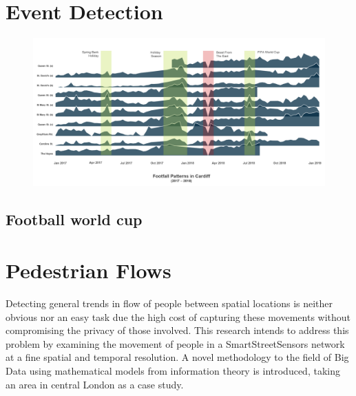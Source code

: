 \section{Event Detection}

\lipsum[1]



\begin{figure}
  \forceversofloat
  \includegraphics[trim={0 50 0 0},clip]{images/applications-cardiff-footfall.png}
  \caption{}
  \label{}
\end{figure}

\subsection{Football world cup}


\section{Pedestrian Flows}
Detecting general trends in flow of people between spatial locations is neither obvious nor an easy task due the high cost of capturing these movements without compromising the privacy of those involved. This research intends to address this problem by examining the movement of people in a SmartStreetSensors network at a fine spatial and temporal resolution. A novel methodology to the field of Big Data using mathematical models from information theory is introduced, taking an area in central London as a case study.

